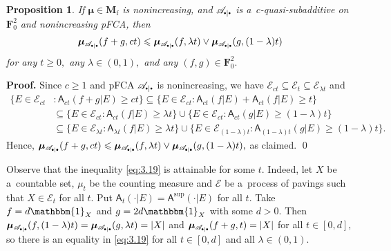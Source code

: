 \documentclass[preprint,11pt]{elsarticle}
\newtheorem{proposition}[tw]{Proposition}
\theoremstyle{definition}
\renewenvironment{proof}[1][\textbf{Proof}]{\noindent\textbf{#1.} }{\hfill\qed\vspace{2.5ex}}
\newcommand\bF{\mathbf{F}} %
\newcommand\bFs{\bF_0^2} %
\newcommand\bMf{\mathbf{M}_{\mathrm{f}}}%
\newcommand\cE{{\mathcal E}}
\newcommand\sA{\mathsf{A}}
\newcommand\aAi[3][E]{\sA^{#3}(#2|#1)}%
\newcommand\aAd[3][E]{\sA_{#3}(#2|#1)}%
\newcommand\sbullet[1][.5]{\mathbin{\vcenter{\hbox{\scalebox{#1}{$\bullet$}}}}}
\newcommand\bpeA{\mathscr {A}_{\sbullet|\sbullet}}%
\newcommand\bE{{\mathscr {E}}}
\newcommand{\bmu}{\boldsymbol{\mu}}
\newcommand\bmub[1][\bpeA]{\bmu_{#1}}
\renewcommand\ge{\geqslant}
\renewcommand\le{\leqslant}
\newcommand{\mI}[1]{\mathbbm{1}_{#1}}%
\newcommand{\mk}{\color{red}{}}
\begin{document}
\begin{proposition}\label{pro:3.19}
If $\bmu\in\bMf$ is nonincreasing, and  $\bpeA$ is a~$c$-quasi-subadditive on $\bF_0^2$ and nonincreasing pFCA, then
\begin{align}\label{eq:3.19}
\bmub(f+g,ct)\le \bmub(f,\lambda t)\vee \bmub(g,(1-\lambda)t)
\end{align}
for any $t\ge 0,$  any $\lambda\in (0,1),$  and  any $(f,g)\in\bFs.$
\end{proposition}
\begin{proof} Since $c\ge 1$ and pFCA $\bpeA$ is nonincreasing, we have $\cE_{ct}\subseteq \cE_t\subseteq \cE_{\lambda t}$ and
\begin{align*}
   \big\{E\in \cE_{ct}&\colon \aAd{f+g}{ct} \ge ct\big\}\subseteq  \big\{E\in \cE_{ct}\colon \aAd{f}{ct}+\aAd{f}{ct} \ge t\big\}
   \\ &\subseteq\big\{E\in \cE_{ct}\colon \aAd{f}{ct} \ge \lambda t\}\cup\{E\in \cE_{ct}\colon \aAd{g}{ct} \ge (1-\lambda)t\big\}
    \\ &\subseteq\big\{E\in \cE_{\lambda t}\colon \aAd{f}{\lambda t} \ge \lambda t\big\}\cup \big\{E\in \cE_{(1-\lambda) t}\colon \aAd{g}{(1-\lambda) t} \ge (1-\lambda)t\big\}.
\end{align*}
Hence, $\bmub(f+g,ct)\le \bmub(f,\lambda t)\vee \bmub(g,(1-\lambda) t),$ as claimed.
\end{proof}

Observe that the inequality \eqref{eq:3.19} is attainable for some $t$. Indeed, let $X$ be a~countable set, $\mu_t$ be the counting measure and $\bE$ be a~process of pavings such that $X\in \cE_t$ for all $t$.
Put $\sA_t(\cdot|E)=\aAi{\cdot}{\sup}$ for all $t.$ Take  $f=d\mI{X}$ and $g=2d\mI{X}$ with some $d>0.$
Then  $\bmub(f,(1-\lambda)t)=\bmub(g,\lambda t)=|X|$ and $\bmub(f+g,t)=|X|$ for all $t\in [0,d],$ so there is an equality in \eqref{eq:3.19} for all $t\in  [0,d]$ and all $\lambda\in (0,1).$

\end{document}
